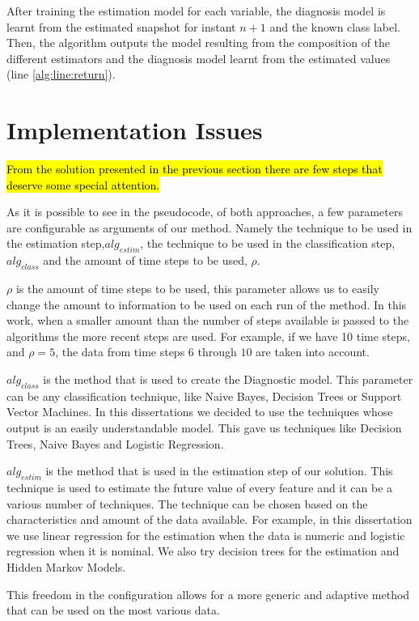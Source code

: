 After training the estimation model for each variable, the diagnosis model is learnt from the estimated snapshot for instant
 $n+1$ and the known class label. Then, the algorithm outputs the model resulting from the composition of the different
 estimators and the diagnosis model learnt from the estimated values (line \ref{alg:line:return}).

\section{Implementation Issues}
\label{section:implementation}

\hl{From the solution presented in the previous section there are few steps that deserve some special attention. }

As it is possible to see in the pseudocode, of both approaches, a few parameters are configurable as arguments of our method. Namely the technique to  be used in the estimation step,$alg_{estim}$, the technique to be used in the classification step,$alg_{class}$ and the amount of time steps to be used, $\rho$. 

$\rho$ is the amount of time steps to be used, this parameter allows us to easily change the amount to information to be used on each run of the method. In this work, when a smaller amount than the number of steps available is passed to the algorithms the more recent steps are used. For example, if we have 10 time steps, and $\rho = 5$, the data from time steps $6$ through $10$ are taken into account.

$alg_{class}$ is the method that is used to create the Diagnostic model. This parameter can be any classification technique, like Naive Bayes, Decision Trees or Support Vector Machines. In this dissertations we decided to use the techniques whose output is an easily understandable model. This gave us techniques like Decision Trees, Naive Bayes and Logistic Regression. 

$alg_{estim}$ is the method that is used in the estimation step of our solution. This technique is used to estimate the future value of every feature and it can be a various number of techniques. The technique can be chosen based on the characteristics and amount of the data available. For example, in this dissertation we use linear regression for the estimation when the data is numeric and logistic regression when it is nominal. We also try decision trees for the estimation and Hidden Markov Models.

This freedom in the configuration allows for a more generic and adaptive method that can be used on the most various data.

